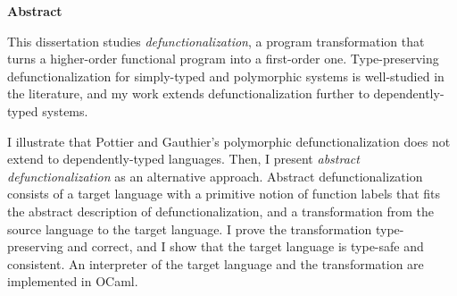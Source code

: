 \newpage
{\Huge \bf Abstract}
\vspace{24pt} 



This dissertation studies \textit{defunctionalization}, a program transformation that turns a higher-order functional program into a first-order one. Type-preserving defunctionalization for simply-typed and polymorphic systems is well-studied in the literature, and my work extends defunctionalization further to dependently-typed systems.

I illustrate that Pottier and Gauthier's polymorphic defunctionalization does not extend to dependently-typed languages. Then, I present \textit{abstract defunctionalization} as an alternative approach. Abstract defunctionalization consists of a target language with a primitive notion of function labels that fits the abstract description of defunctionalization, and a transformation from the source language to the target language. I prove the transformation type-preserving and correct, and I show that the target language is type-safe and consistent. An interpreter of the target language and the transformation are implemented in OCaml.


\newpage